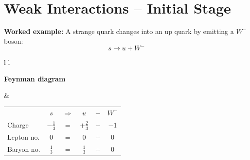 \documentclass[12pt]{article}
\begin{document}
\section*{Weak Interactions -- Initial Stage}

\textbf{Worked example:} A strange quark changes into an up quark by emitting a \(W^-\) boson:
\[
s \rightarrow u + W^-
\]

\vspace{0.5cm}

\begin{tabular}{l l}

\begin{minipage}[t]{0.46\textwidth}
\vspace{0pt}
\textbf{Feynman diagram}

\vspace{0.6cm}

\begin{tikzpicture}
\begin{feynman}
  \vertex (l1) at (0,0) {\(s\)};
  \vertex [coordinate] (a) at (1,2) {};
  \vertex (l2) at (0,4) {\(u\)};
  \vertex (b) at (4,2) {};

  \diagram*{
    (l1) -- [fermion] (a) -- [fermion] (l2),
    (a) -- [boson, edge label=\(W^-\), momentum'={}] (b),
  };
\end{feynman}
\end{tikzpicture}
\end{minipage}
&
\begin{minipage}[t]{0.50\textwidth}
\vspace{0pt}

\renewcommand{\arraystretch}{1.4}
\begin{tabular}{@{}l c c c c c@{}}
 & \(s\) & \(\Rightarrow\) & \(u\) & \(+\) & \(W^-\) \\
Charge & $-\tfrac{1}{3}$ & $=$ & $+\tfrac{2}{3}$ & $+$ & $-1$ \\
Lepton no. & $0$ & $=$ & $0$ & $+$ & $0$ \\
Baryon no. & $\tfrac{1}{3}$ & $=$ & $\tfrac{1}{3}$ & $+$ & $0$ \\
\end{tabular}

\end{minipage}

\end{tabular}

\vspace{0.8cm}
\end{document}
